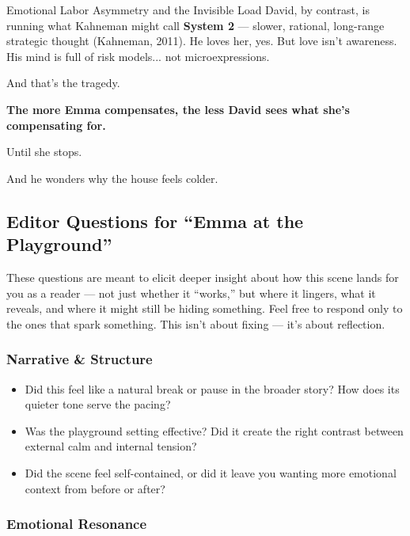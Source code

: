 \begin{PsychologicalSidebar}{Emotional Labor Asymmetry and the Invisible Load}
  David, by contrast, is running what Kahneman might call \textbf{System 2} —  
  slower, rational, long-range strategic thought (Kahneman, 2011).  
  He loves her, yes. But love isn’t awareness.  
  His mind is full of risk models... not microexpressions.
  
  \medskip
  
  And that’s the tragedy.
  
  \medskip
  
  \textbf{The more Emma compensates, the less David sees what she’s compensating for.}
  
  \medskip
  
  Until she stops.
  
  \medskip
  
  And he wonders why the house feels colder.
  
\end{PsychologicalSidebar}
  

\subsection*{Editor Questions for ``Emma at the Playground''}

These questions are meant to elicit deeper insight about how this scene lands for you as a reader — not just whether it “works,” but where it lingers, what it reveals, and where it might still be hiding something. Feel free to respond only to the ones that spark something. This isn’t about fixing — it’s about reflection.

\subsubsection*{Narrative \& Structure}

\begin{itemize}
  \item Did this feel like a natural break or pause in the broader story? How does its quieter tone serve the pacing?
  \item Was the playground setting effective? Did it create the right contrast between external calm and internal tension?
  \item Did the scene feel self-contained, or did it leave you wanting more emotional context from before or after?
\end{itemize}

\subsubsection*{Emotional Resonance}

